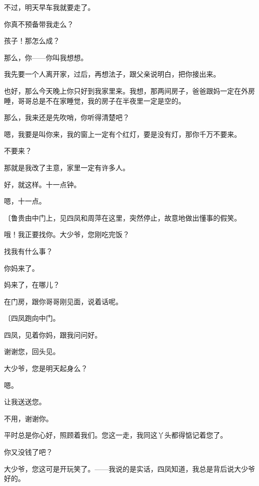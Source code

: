 不过，明天早车我就要走了。

你真不预备带我走么？

孩子！那怎么成？

那么，你——你叫我想想。

我先要一个人离开家，过后，再想法子，跟父亲说明白，把你接出来。

也好，那么今天晚上你只好到我家里来。我想，那两间房子，爸爸跟妈一定在外房睡，哥哥总是不在家睡觉，我的房子在半夜里一定是空的。

那么，我来还是先吹哨，你听得清楚吧？

嗯，我要是叫你来，我的窗上一定有个红灯，要是没有灯，那你千万不要来。

不要来？

那就是我改了主意，家里一定有许多人。

好，就这样。十一点钟。

嗯，十一点。

{\fangsong〔鲁贵由中门上，见四凤和周萍在这里，突然停止，故意地做出懂事的假笑。}

哦！我正要找你。大少爷，您刚吃完饭？

找我有什么事？

你妈来了。

妈来了，在哪儿？

在门房，跟你哥哥刚见面，说着话呢。

{\fangsong〔四凤跑向中门。}

四凤，见着你妈，跟我问问好。

谢谢您，回头见。

大少爷，您是明天起身么？

嗯。

让我送送您。

不用，谢谢你。

平时总是你心好，照顾着我们。您这一走，我同这丫头都得惦记着您了。

你又没钱了吧？

大少爷，您这可是开玩笑了。——我说的是实话，四凤知道，我总是背后说大少爷好的。

